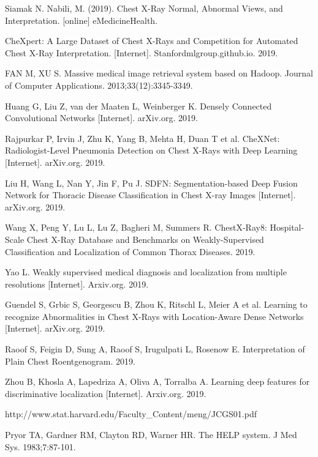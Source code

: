 \documentclass{amia}
\begin{document}

\begin{thebibliography}{1}
\setlength\itemsep{-0.1em}

Siamak N. Nabili, M. (2019). Chest X-Ray Normal, Abnormal Views, and Interpretation. [online] eMedicineHealth.

CheXpert: A Large Dataset of Chest X-Rays and Competition for Automated Chest X-Ray Interpretation. [Internet]. Stanfordmlgroup.github.io. 2019.

FAN M, XU S. Massive medical image retrieval system based on Hadoop. Journal of Computer Applications. 2013;33(12):3345-3349.

Huang G, Liu Z, van der Maaten L, Weinberger K. Densely Connected Convolutional Networks [Internet]. arXiv.org. 2019.

Rajpurkar P, Irvin J, Zhu K, Yang B, Mehta H, Duan T et al. CheXNet: Radiologist-Level Pneumonia Detection on Chest X-Rays with Deep Learning [Internet]. arXiv.org. 2019.

Liu H, Wang L, Nan Y, Jin F, Pu J. SDFN: Segmentation-based Deep Fusion Network for Thoracic Disease Classification in Chest X-ray Images [Internet]. arXiv.org. 2019.

Wang X, Peng Y, Lu L, Lu Z, Bagheri M, Summers R. ChestX-Ray8: Hospital-Scale Chest X-Ray Database and Benchmarks on Weakly-Supervised Classification and Localization of Common Thorax Diseases. 2019.

Yao L. Weakly supervised medical diagnosis and localization from multiple resolutions [Internet]. Arxiv.org. 2019.

Guendel S, Grbic S, Georgescu B, Zhou K, Ritschl L, Meier A et al. Learning to recognize Abnormalities in Chest X-Rays with Location-Aware Dense Networks [Internet]. arXiv.org. 2019.

Raoof S, Feigin D, Sung A, Raoof S, Irugulpati L, Rosenow E. Interpretation of Plain Chest Roentgenogram. 2019.

Zhou B, Khosla A, Lapedriza A, Oliva A, Torralba A. Learning deep features for discriminative localization [Internet]. Arxiv.org. 2019.

http://www.stat.harvard.edu/Faculty\_Content/meng/JCGS01.pdf

Pryor TA, Gardner RM, Clayton RD, Warner HR. The HELP system. J Med Sys. 1983;7:87-101.


\end{thebibliography}
\end{document}

